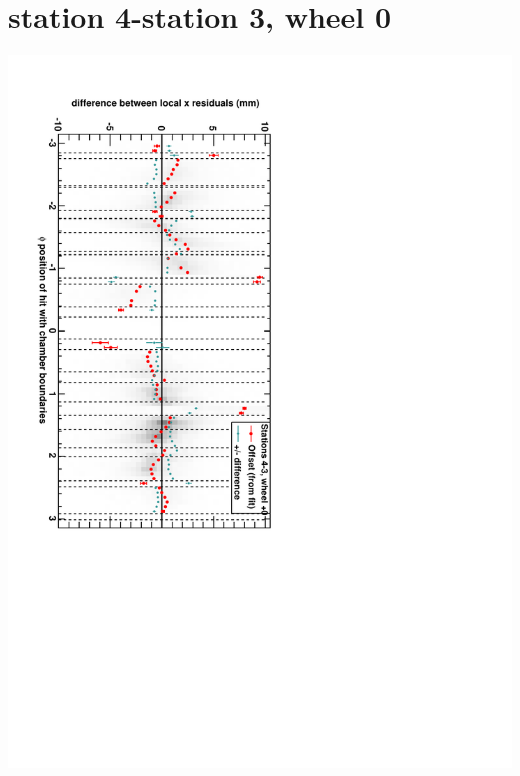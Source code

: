 \documentclass[compress]{beamer}
\begin{document}
\section*{station 4-station 3, wheel 0}
\begin{frame} \vfill \mbox{\hspace{-1 cm}\includegraphics[height=1.2\linewidth, angle=90]{DTrphidiff34VsPhi_whC_slope.pdf}} \end{frame}
\end{document}
